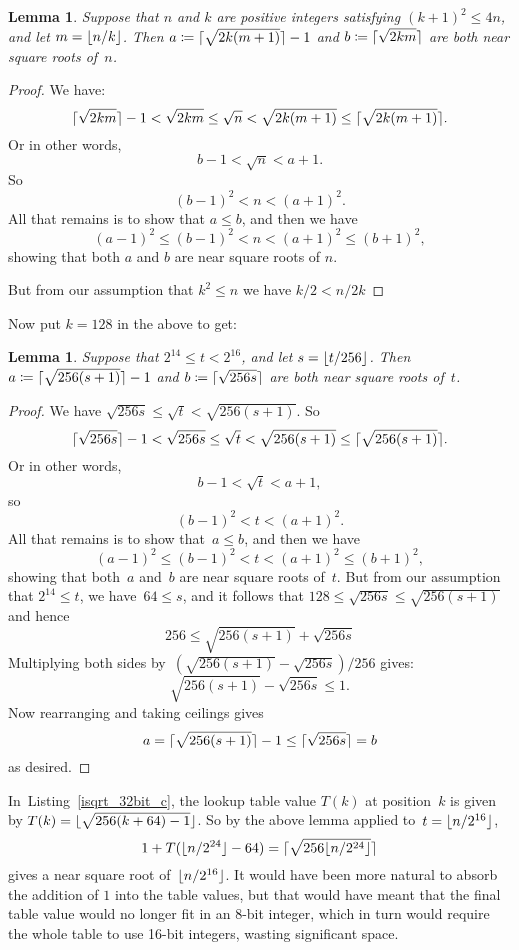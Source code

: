 \documentclass[a4paper]{article}
\DeclarePairedDelimiter\floor{\lfloor}{\rfloor}
\DeclarePairedDelimiter\ceil{\lceil}{\rceil}
\newcommand{\isqrt}[1]{\floor{\sqrt{#1}}}
\newcommand{\csqrt}[1]{\ceil{\sqrt{#1}}}
\theoremstyle{plain}
\newtheorem{lemma}[theorem]{Lemma}
\theoremstyle{definition}
\begin{document}
\begin{lemma} Suppose that $n$ and $k$ are positive integers satisfying
  $(k+1)^2 \le 4n$, and let $m = \floor{n / k}$.
  Then $a \coloneqq \csqrt{2k(m+1)} - 1$ and $b \coloneqq \csqrt{2km}$
  are both near square roots of~$n$.
\end{lemma}

\begin{proof}
  We have:
    $$\csqrt{2km} - 1
      < \sqrt{2km}
      \le \sqrt n
      < \sqrt{2k(m+1)}
      \le \csqrt{2k(m+1)}.$$
  Or in other words,
    $$b - 1 < \sqrt n < a + 1.$$
  So
    $$(b - 1)^2 < n < (a + 1)^2.$$
  All that remains is to show that $a \le b$, and then we have
    $$(a - 1)^2 \le (b - 1)^2 < n < (a + 1)^2 \le (b + 1)^2,$$
  showing that both $a$ and $b$ are near square roots of $n$.

  But from our assumption that $k^2 \le n$ we have $k/2 < n / 2k$

\end{proof}

Now put $k=128$ in the above to get:

\begin{lemma} Suppose that $2^{14} \le t < 2^{16}$, and let $s = \floor{t /
256}$. Then $a \coloneqq \csqrt{256(s+1)} - 1$ and $b \coloneqq \csqrt{256s}$
are both near square roots of~$t$.
\end{lemma}

\begin{proof}
We have $\sqrt{256s} \le \sqrt{t} <
\sqrt{256(s+1)}$. So
$$\csqrt{256s} - 1 < \sqrt{256s} \le \sqrt t < \sqrt{256(s+1)} \le \csqrt{256(s+1)}.$$
Or in other words,
$$b - 1 < \sqrt t < a + 1,$$
so
$$(b - 1)^2 < t < (a + 1)^2.$$
All that remains is to show that~$a\le b$, and then we have
$$(a - 1)^2 \le (b - 1)^2 < t < (a + 1)^2 \le (b + 1)^2,$$ showing that
both~$a$ and~$b$ are near square roots of~$t$. But from our assumption that
$2^{14} \le t$, we have~$64 \le s$, and it follows that $128 \le \sqrt{256s}
\le \sqrt{256(s+1)}$ and hence
$$256 \le \sqrt{256(s+1)} + \sqrt{256s}$$ Multiplying both sides
by~$(\sqrt{256(s+1)} - \sqrt{256s}) / 256$ gives:
$$\sqrt{256(s+1)} - \sqrt{256s} \le 1.$$ Now rearranging and taking ceilings
gives
$$a = \csqrt{256(s+1)} - 1 \le \csqrt{256s} = b$$ as desired.
\end{proof}

In~Listing~\ref{isqrt_32bit_c}, the lookup table value $T(k)$ at position~$k$
is given by $T(k) = \isqrt{256(k + 64) - 1}$. So by the above lemma applied
to~$t=\floor{n / 2^{16}}$,
$$1 + T(\floor{n / 2^{24}} - 64) = \csqrt{256 \floor{n / 2^{24}}}$$ gives a
near square root of~$\floor{n / 2^{16}}$. It would have been more natural to
absorb the addition of $1$ into the table values, but that would have meant
that the final table value would no longer fit in an 8-bit integer, which in
turn would require the whole table to use 16-bit integers, wasting significant
space.
\end{document}
